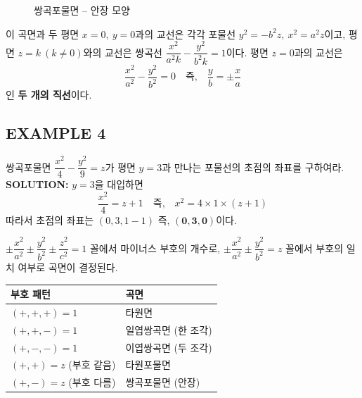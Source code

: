 \documentclass{article}
\theoremstyle{mystyle}
\begin{document}
\begin{figure}[h]
\centering
{}
\caption{쌍곡포물면 -- 안장 모양}
\end{figure}

이 곡면과 두 평면 \(x=0,\ y=0\)과의 교선은 각각 포물선 \(y^2=-b^2z,\ x^2=a^2z\)이고, 평면 \(z=k\ (k\ne0)\)와의 교선은 쌍곡선 \(\dfrac{x^2}{a^2k}-\dfrac{y^2}{b^2k}=1\)이다. 평면 \(z=0\)과의 교선은
\[
\frac{x^2}{a^2}-\frac{y^2}{b^2}=0 \quad\text{즉,}\quad \frac{y}{b}=\pm\frac{x}{a}
\]
인 \textbf{두 개의 직선}이다.

\subsection*{EXAMPLE 4}
쌍곡포물면 \(\dfrac{x^2}{4}-\dfrac{y^2}{9}=z\)가 평면 \(y=3\)과 만나는 포물선의 초점의 좌표를 구하여라.\\
\textbf{SOLUTION:} \(y=3\)을 대입하면
\[
\frac{x^2}{4}=z+1 \quad\text{즉,}\quad x^2=4\times1\times(z+1)
\]
따라서 초점의 좌표는 \((0,3,1-1)\) 즉, \(\boldsymbol{(0,3,0)}\)이다.

\begin{tcolorbox}[
    colback=red!4,
    colframe=red!60!black,
    title=이차곡면 판별 요약,
    fonttitle=\bfseries,
    boxrule=0.5mm,
    arc=3mm
    ]
    \(\pm\dfrac{x^2}{a^2}\pm\dfrac{y^2}{b^2}\pm\dfrac{z^2}{c^2}=1\) 꼴에서 마이너스 부호의 개수로, \(\pm\dfrac{x^2}{a^2}\pm\dfrac{y^2}{b^2}=z\) 꼴에서 부호의 일치 여부로 곡면이 결정된다.
\end{tcolorbox}

\begin{center}
\renewcommand{\arraystretch}{1.4}
\begin{tabular}{|l|l|}
\hline
부호 패턴 & 곡면 \\
\hline
\((+,+,+)=1\) & 타원면 \\
\hline
\((+,+,-)=1\) & 일엽쌍곡면 (한 조각) \\
\hline
\((+,-,-)=1\) & 이엽쌍곡면 (두 조각) \\
\hline
\((+,+)=z\) (부호 같음) & 타원포물면 \\
\hline
\((+,-)=z\) (부호 다름) & 쌍곡포물면 (안장) \\
\hline
\end{tabular}
\end{center}
\end{document}
